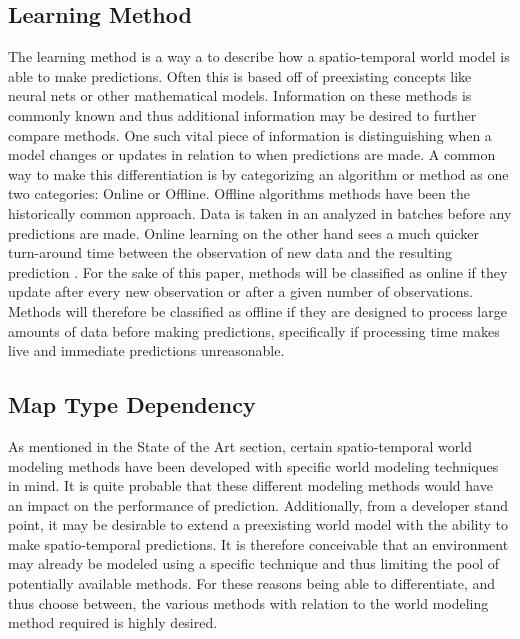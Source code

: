   \subsection{ Learning Method }
  The learning method is a way a to describe how a spatio-temporal world model is able to
  make predictions. Often this is based off of preexisting concepts like neural
  nets or other mathematical models. Information on these methods is commonly known
  and thus additional information may be desired to further compare methods.
  One such vital piece of information is distinguishing when a model
  changes or updates in relation to when predictions are made. A common way to
  make this differentiation is by categorizing an algorithm or method as one
  two categories: Online or Offline. Offline algorithms methods have been the
  historically common approach. Data is taken in an analyzed in batches before
  any predictions are made. Online
  learning on the other hand sees a much quicker turn-around time between the
  observation of new data and the resulting prediction \cite{Karp1992}. For the sake of this
  paper, methods will be classified as online if they update
  after every new observation or after a given number of observations. Methods
  will therefore be classified as offline if they are designed to
  process large amounts of data before making predictions, specifically if
  processing time makes live and immediate predictions unreasonable. \\

  \subsection{ Map Type Dependency }
  As mentioned in the State of the Art section, certain spatio-temporal world
  modeling methods have been developed with specific world modeling techniques in
  mind. It is quite probable that these different modeling methods would
  have an impact on the performance of prediction. Additionally,
  from a developer stand point, it may be desirable to extend a preexisting
  world model with the ability to make spatio-temporal predictions. It is
  therefore conceivable that an environment may already be modeled using a
  specific technique and thus limiting the pool of potentially available methods.
  For these reasons being able to differentiate, and thus choose
  between, the various methods with relation to the world modeling method
  required is highly desired. \\



